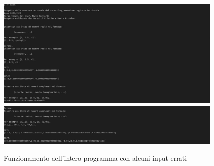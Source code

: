 \documentclass{report}
\begin{document}
     \begin{center}
       \begin{figure}
         \includegraphics[width=\textwidth]{test_pl_10a.jpg}
         \includegraphics[width=\textwidth]{test_pl_10b.jpg}
         \caption{Funzionamento dell'intero programma con alcuni input errati}
       \end{figure}
     \end{center}
\end{document}
